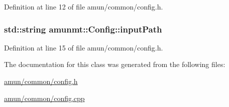 Definition at line 12 of file amun/common/config.\+h.

\subsubsection[{\texorpdfstring{input\+Path}{inputPath}}]{\setlength{\rightskip}{0pt plus 5cm}std\+::string amunmt\+::\+Config\+::input\+Path}\hypertarget{classamunmt_1_1Config_a3e3069f6b6637092d6cfe202f1e57b25}{}\label{classamunmt_1_1Config_a3e3069f6b6637092d6cfe202f1e57b25}


Definition at line 15 of file amun/common/config.\+h.



The documentation for this class was generated from the following files\+:\begin{DoxyCompactItemize}
\item 
\hyperlink{amun_2common_2config_8h}{amun/common/config.\+h}\item 
\hyperlink{amun_2common_2config_8cpp}{amun/common/config.\+cpp}\end{DoxyCompactItemize}
